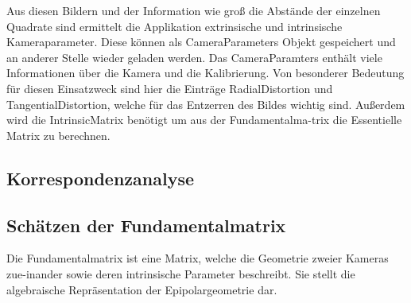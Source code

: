 Aus diesen Bildern und der Information wie groß die Abstände der einzelnen Quadrate sind ermittelt die Applikation extrinsische und intrinsische Kameraparameter. Diese können als CameraParameters Objekt gespeichert und an anderer Stelle wieder geladen werden. Das CameraParamters enthält viele Informationen über die Kamera und die Kalibrierung. Von besonderer Bedeutung für diesen Einsatzweck sind hier die Einträge RadialDistortion und TangentialDistortion, welche für das Entzerren des Bildes wichtig sind. Außerdem wird die IntrinsicMatrix benötigt um aus der Fundamentalma-trix die Essentielle Matrix zu berechnen. 

\subsection{Korrespondenzanalyse}

\subsection{Schätzen der Fundamentalmatrix}
Die Fundamentalmatrix ist eine Matrix, welche die Geometrie zweier Kameras zue-inander sowie deren intrinsische Parameter beschreibt. Sie stellt die algebraische Repräsentation der Epipolargeometrie dar.

